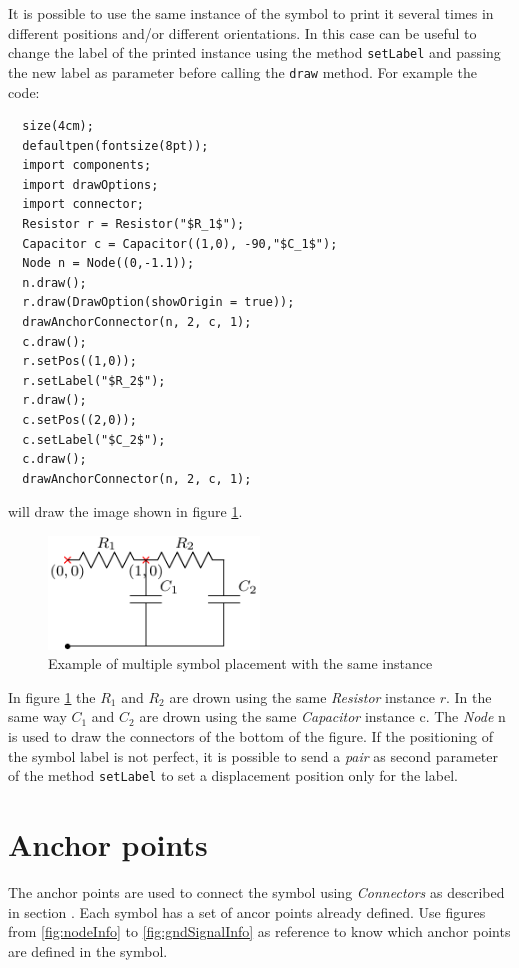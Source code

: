 \documentclass[a4paper,12pt]{report}
\begin{document}
It is possible to use the same instance of the symbol to print it several times in different positions and/or different orientations. In this case can be useful to change the label of the printed instance using the method \texttt{setLabel} and passing the new label as parameter before calling the \texttt{draw} method. For example the code:
\begin{lstlisting}
  size(4cm);
  defaultpen(fontsize(8pt));
  import components;
  import drawOptions;
  import connector;
  Resistor r = Resistor("$R_1$");
  Capacitor c = Capacitor((1,0), -90,"$C_1$");
  Node n = Node((0,-1.1));
  n.draw();
  r.draw(DrawOption(showOrigin = true));
  drawAnchorConnector(n, 2, c, 1);
  c.draw();
  r.setPos((1,0));
  r.setLabel("$R_2$");
  r.draw();
  c.setPos((2,0));
  c.setLabel("$C_2$");
  c.draw();
  drawAnchorConnector(n, 2, c, 1);
\end{lstlisting}
will draw the image shown in figure \ref{fig:placingExample3}.
\begin{figure}[ht]
  \centering
  \includegraphics[width=0.5\textwidth]{placingExample3.pdf}
  \caption{Example of multiple symbol placement with the same instance}
  \label{fig:placingExample3}
\end{figure}

In figure \ref{fig:placingExample3} the $R_1$ and $R_2$ are drown using the same \emph{Resistor} instance $r$. In the same way $C_1$ and $C_2$ are drown using the same \emph{Capacitor} instance c. The \emph{Node} n is used to draw the connectors of the bottom of the figure. If the positioning of the symbol label is not perfect, it is possible to send a \emph{pair} as second parameter of the method \texttt{setLabel} to set a displacement position only for the label. 

\section*{Anchor points}
\label{sct:anchorPoints}

The anchor points are used to connect the symbol using \emph{Connectors} as described in section . Each symbol has a set of ancor points already defined. Use figures from \ref{fig:nodeInfo} to \ref{fig:gndSignalInfo} as reference to know which anchor points are defined in the symbol.
\end{document}

